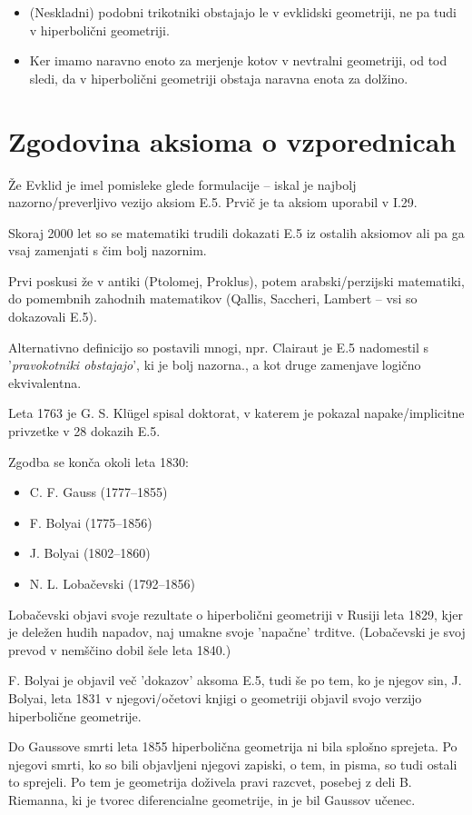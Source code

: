 \begin{opomba}
    \begin{itemize}
        \item (Neskladni) podobni trikotniki obstajajo le v evklidski geometriji, ne pa tudi v hiperbolični geometriji.
        \item Ker imamo naravno enoto za merjenje kotov v nevtralni geometriji, od tod sledi, da v hiperbolični geometriji obstaja naravna enota za dolžino.
    \end{itemize}
\end{opomba}

\section{Zgodovina aksioma o vzporednicah}

Že Evklid je imel pomisleke glede formulacije -- iskal je najbolj nazorno/preverljivo vezijo aksiom E.5. Prvič je ta aksiom uporabil v  I.29.

Skoraj 2000 let so se matematiki trudili dokazati E.5 iz ostalih aksiomov  ali pa ga vsaj zamenjati s čim bolj nazornim.

Prvi poskusi že v antiki (Ptolomej, Proklus), potem arabski/perzijski matematiki, do pomembnih zahodnih matematikov (Qallis, Saccheri, Lambert -- vsi so dokazovali E.5).

Alternativno definicijo so postavili mnogi, npr. Clairaut je E.5 nadomestil s '\textit{pravokotniki obstajajo}', ki je bolj nazorna., a kot druge zamenjave logično ekvivalentna.

Leta 1763 je G. S. Klügel spisal doktorat, v katerem je pokazal napake/implicitne privzetke v 28 dokazih E.5.

Zgodba se konča okoli leta 1830:
\begin{itemize}
    \item C. F. Gauss (1777--1855)
    \item F. Bolyai (1775--1856)
    \item J. Bolyai (1802--1860)
    \item N. L. Lobačevski (1792--1856)
\end{itemize}

Lobačevski objavi svoje rezultate o hiperbolični geometriji v Rusiji leta 1829, kjer je deležen hudih napadov, naj umakne svoje 'napačne' trditve. (Lobačevski je svoj prevod v nemščino dobil šele leta 1840.)

F. Bolyai je objavil več 'dokazov' aksoma E.5, tudi še po tem, ko je njegov sin, J. Bolyai, leta 1831 v njegovi/očetovi knjigi o geometriji objavil svojo verzijo hiperbolične geometrije.

Do Gaussove smrti leta 1855 hiperbolična geometrija ni bila splošno sprejeta. Po njegovi smrti, ko so bili objavljeni njegovi zapiski, o tem, in pisma, so tudi ostali to sprejeli.
Po tem je geometrija doživela pravi razcvet, posebej z deli B.  Riemanna, ki je tvorec diferencialne geometrije, in je bil Gaussov učenec.
